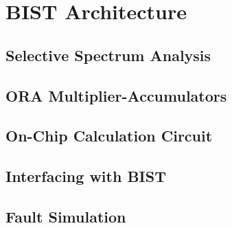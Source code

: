 \documentclass[12pt]{report}
\begin{document}
\section{BIST Architecture}

\subsection{Selective Spectrum Analysis}

\subsection{ORA Multiplier-Accumulators}

\subsection{On-Chip Calculation Circuit}

\subsection{Interfacing with BIST}

 
\subsection{Fault Simulation}
\end{document}
